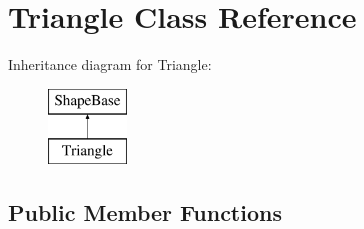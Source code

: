 \hypertarget{classTriangle}{}\section{Triangle Class Reference}
\label{classTriangle}
Inheritance diagram for Triangle\+:\begin{figure}[H]
\begin{center}
\leavevmode
\includegraphics[height=2.000000cm]{classTriangle}
\end{center}
\end{figure}
\subsection*{Public Member Functions}
